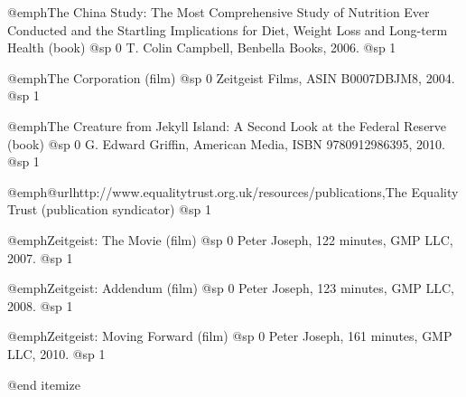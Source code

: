 \item
@emph{The China Study: The Most Comprehensive Study of Nutrition Ever Conducted and the Startling Implications for Diet, Weight Loss and Long-term Health} (book)
@sp 0
T. Colin Campbell, Benbella Books, 2006.
@sp 1

\item
@emph{The Corporation} (film)
@sp 0
Zeitgeist Films, ASIN B0007DBJM8, 2004.
@sp 1

\item
@emph{The Creature from Jekyll Island: A Second Look at the Federal Reserve} (book)
@sp 0
G. Edward Griffin, American Media, ISBN 9780912986395, 2010.
@sp 1

\item
@emph{@url{http://www.equalitytrust.org.uk/resources/publications,The Equality Trust}} (publication syndicator)
@sp 1

\item
@emph{Zeitgeist: The Movie} (film)
@sp 0
Peter Joseph, 122 minutes, GMP LLC, 2007.
@sp 1

\item
@emph{Zeitgeist: Addendum} (film)
@sp 0
Peter Joseph, 123 minutes, GMP LLC, 2008.
@sp 1

\item
@emph{Zeitgeist: Moving Forward} (film)
@sp 0
Peter Joseph, 161 minutes, GMP LLC, 2010.
@sp 1

@end itemize

